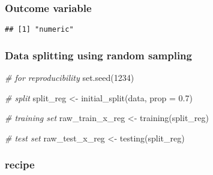 \documentclass[
]{book}
\newenvironment{Shaded}{\begin{snugshade}}{\end{snugshade}}
\newcommand{\AttributeTok}[1]{\textcolor[rgb]{0.77,0.63,0.00}{#1}}
\newcommand{\CommentTok}[1]{\textcolor[rgb]{0.56,0.35,0.01}{\textit{#1}}}
\newcommand{\DecValTok}[1]{\textcolor[rgb]{0.00,0.00,0.81}{#1}}
\newcommand{\FloatTok}[1]{\textcolor[rgb]{0.00,0.00,0.81}{#1}}
\newcommand{\FunctionTok}[1]{\textcolor[rgb]{0.00,0.00,0.00}{#1}}
\newcommand{\NormalTok}[1]{#1}
\newcommand{\OtherTok}[1]{\textcolor[rgb]{0.56,0.35,0.01}{#1}}
\newcommand{\SpecialCharTok}[1]{\textcolor[rgb]{0.00,0.00,0.00}{#1}}
\begin{document}
\hypertarget{outcome-variable}{%
\subsubsection{Outcome variable}\label{outcome-variable}}

\begin{Shaded}
\end{Shaded}

\begin{verbatim}
## [1] "numeric"
\end{verbatim}

\hypertarget{data-splitting-using-random-sampling}{%
\subsubsection{Data splitting using random sampling}\label{data-splitting-using-random-sampling}}

\begin{Shaded}
\begin{Highlighting}[]
\CommentTok{\# for reproducibility }
\FunctionTok{set.seed}\NormalTok{(}\DecValTok{1234}\NormalTok{) }

\CommentTok{\# split }
\NormalTok{split\_reg }\OtherTok{\textless{}{-}} \FunctionTok{initial\_split}\NormalTok{(data, }\AttributeTok{prop =} \FloatTok{0.7}\NormalTok{)}

\CommentTok{\# training set }
\NormalTok{raw\_train\_x\_reg }\OtherTok{\textless{}{-}} \FunctionTok{training}\NormalTok{(split\_reg)}

\CommentTok{\# test set }
\NormalTok{raw\_test\_x\_reg }\OtherTok{\textless{}{-}} \FunctionTok{testing}\NormalTok{(split\_reg)}
\end{Highlighting}
\end{Shaded}

\hypertarget{recipe}{%
\subsubsection{recipe}\label{recipe}}
\end{document}
